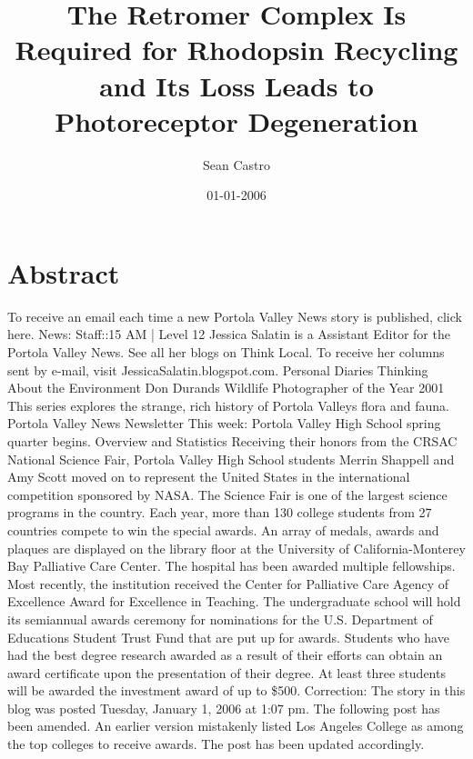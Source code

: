 \documentclass{article}%
\title{The Retromer Complex Is Required for Rhodopsin Recycling and Its Loss Leads to Photoreceptor Degeneration}%
\author{Sean Castro}%
\affil{School of Dentistry, Chung Shan Medical University, Taichung 40201, Taiwan}%
\date{01{-}01{-}2006}%
\begin{document}
%
\normalsize%
\maketitle%
\section{Abstract}%
\label{sec:Abstract}%
To receive an email each time a new Portola Valley News story is published, click here.\newline%
News:\newline%
Staff::15 AM | Level 12\newline%
Jessica Salatin is a Assistant Editor for the Portola Valley News.\newline%
See all her blogs on Think Local.\newline%
To receive her columns sent by e{-}mail, visit JessicaSalatin.blogspot.com.\newline%
Personal Diaries\newline%
Thinking About the Environment\newline%
Don Durands Wildlife Photographer of the Year 2001\newline%
This series explores the strange, rich history of Portola Valleys flora and fauna.\newline%
Portola Valley News Newsletter\newline%
This week: Portola Valley High School spring quarter begins.\newline%
Overview and Statistics\newline%
Receiving their honors from the CRSAC National Science Fair, Portola Valley High School students Merrin Shappell and Amy Scott moved on to represent the United States in the international competition sponsored by NASA. The Science Fair is one of the largest science programs in the country. Each year, more than 130 college students from 27 countries compete to win the special awards.\newline%
An array of medals, awards and plaques are displayed on the library floor at the University of California{-}Monterey Bay Palliative Care Center. The hospital has been awarded multiple fellowships. Most recently, the institution received the Center for Palliative Care Agency of Excellence Award for Excellence in Teaching.\newline%
The undergraduate school will hold its semiannual awards ceremony for nominations for the U.S. Department of Educations Student Trust Fund that are put up for awards. Students who have had the best degree research awarded as a result of their efforts can obtain an award certificate upon the presentation of their degree. At least three students will be awarded the investment award of up to \$500.\newline%
Correction: The story in this blog was posted Tuesday, January 1, 2006 at 1:07 pm. The following post has been amended. An earlier version mistakenly listed Los Angeles College as among the top colleges to receive awards. The post has been updated accordingly.
\end{document}
